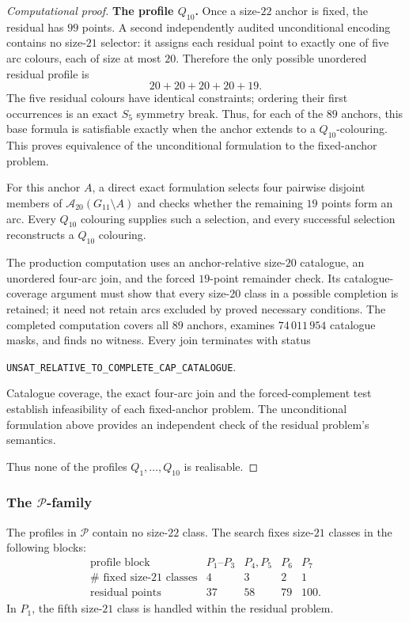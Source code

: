 \documentclass[11pt]{article}
\theoremstyle{definition}
\theoremstyle{remark}
\begin{document}
\begin{proof}[Computational proof]
\medskip\noindent\textbf{The profile \(Q_{10}\).}\quad
Once a size-\(22\) anchor is fixed, the residual has \(99\) points.  A second
independently audited unconditional encoding contains no size-\(21\) selector:
it assigns each residual point to exactly one of five arc colours, each of
size at most \(20\).  Therefore the only possible unordered residual profile
is
\[
  20+20+20+20+19.
\]
The five residual colours have identical constraints; ordering their first
occurrences is an exact \(S_5\) symmetry break.  Thus, for each of the \(89\)
anchors, this base formula is satisfiable exactly when the anchor extends to a
\(Q_{10}\)-colouring.  This proves equivalence of the unconditional formulation to the
fixed-anchor problem.

For this anchor \(A\), a direct exact formulation selects four pairwise
disjoint members of \(\mathcal A_{20}(G_{11}\setminus A)\) and checks
whether the remaining \(19\) points form an arc.  Every \(Q_{10}\)
colouring supplies such a selection, and every successful selection
reconstructs a \(Q_{10}\) colouring.

The production computation uses an anchor-relative size-\(20\) catalogue,
an unordered four-arc join, and the forced \(19\)-point remainder check.
Its catalogue-coverage argument must show that every size-\(20\) class
in a possible completion is retained; it need not retain arcs excluded by
proved necessary conditions.
The completed computation covers
all \(89\) anchors, examines \(74\,011\,954\) catalogue masks, and finds no
witness.  Every join terminates with status
\begin{center}
\small\texttt{UNSAT\_RELATIVE\_TO\_COMPLETE\_CAP\_CATALOGUE}.
\end{center}
Catalogue coverage,
the exact four-arc join and the forced-complement test establish infeasibility
of each fixed-anchor problem.  The unconditional formulation above provides
an independent check of the residual problem's semantics.

Thus none of the profiles \(Q_1,\ldots,Q_{10}\) is realisable.
\end{proof}

\subsubsection{The \texorpdfstring{\(\mathcal P\)}{P}-family}

The profiles in \(\mathcal P\) contain no size-\(22\) class.
The search fixes size-\(21\) classes in the following blocks:
\[
\begin{array}{c|cccc}
\text{profile block} & P_1\text{--}P_3 & P_4,P_5 & P_6 & P_7\\
\hline
\#\text{ fixed size-21 classes} & 4 & 3 & 2 & 1\\
\text{residual points} & 37 & 58 & 79 & 100.
\end{array}
\]
In \(P_1\), the fifth size-\(21\) class is handled within the residual
problem.
\end{document}

